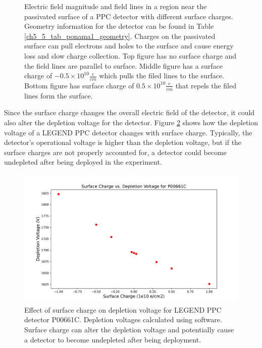 \begin{figure}
\caption{Electric field magnitude and field lines in a region near the passivated surface of a {\ponama} PPC detector with different surface charges. Geometry information for the detector can be found in Table \ref{ch5_5_tab_ponama1_geometry}. Charges on the passivated surface can pull electrons and holes to the surface and cause energy loss and slow charge collection. Top figure has no surface charge and the field lines are parallel to surface. Middle figure has a surface charge of $-0.5 \times 10^{10} \frac{e}{cm}$ which pulls the filed lines to the surface. Bottom figure has surface charge of $0.5 \times 10^{10} \frac{e}{cm}$ that repels the filed lines form the surface.}
\label{ch3_fig_surface_field_sc0}
\end{figure}

Since the surface charge changes the overall electric field of the detector, it could also alter the depletion voltage for the detector. Figure \ref{ch3_fig_deplection_sc} shows how the depletion voltage of a LEGEND PPC detector changes with surface charge. Typically, the detector's operational voltage is higher than the depletion voltage, but if the surface charges are not properly accounted for, a detector could become undepleted after being deployed in the experiment.

\begin{figure}[!htb]
\centering
\includegraphics[trim={1cm 0.4cm 1cm 1.75cm},clip,width=0.99\linewidth]{ch3/figs/deplep_sc.pdf}
 \caption{Effect of surface charge on depletion voltage for LEGEND PPC detector P00661C. Depletion voltages calculated using {\siggen} software. Surface charge can alter the depletion voltage and potentially cause a detector to become undepleted after being deployment.
}
\label{ch3_fig_deplection_sc}
  \end{figure}

